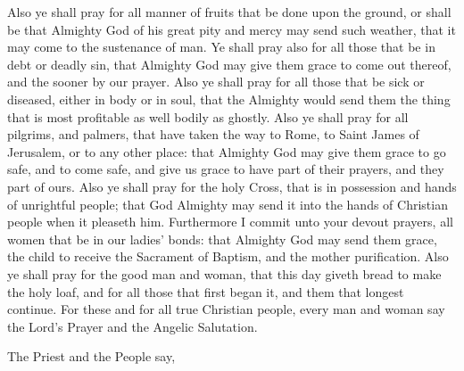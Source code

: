 Also ye shall pray for all manner of fruits that be done upon the ground, or shall be that Almighty God of his great pity and mercy may send such weather, that it may come to the sustenance of man. Ye shall pray also for all those that be in debt or deadly sin, that Almighty God may give them grace to come out thereof, and the sooner by our prayer. Also ye shall pray for all those that be sick or diseased, either in body or in soul, that the Almighty would send them the thing that is most profitable as well bodily as ghostly. Also ye shall pray for all pilgrims, and palmers, that have taken the way to Rome, to Saint James of Jerusalem, or to any other place: that Almighty God may give them grace to go safe, and to come safe, and give us grace to have part of their prayers, and they part of ours. Also ye shall pray for the holy Cross, that is in possession and hands of unrightful people; that God Almighty may send it into the hands of Christian people when it pleaseth him. Furthermore I commit unto your devout prayers, all women that be in our ladies' bonds: that Almighty God may send them grace, the child to receive the Sacrament of Baptism, and the mother purification. Also ye shall pray for the good man and woman, that this day giveth bread to make the holy loaf, and for all those that first began it, and them that longest continue. For these and for all true Christian people, every man and woman say the Lord's Prayer and the Angelic Salutation.

\begin{rubric}
    The Priest and the People say,
\end{rubric}

